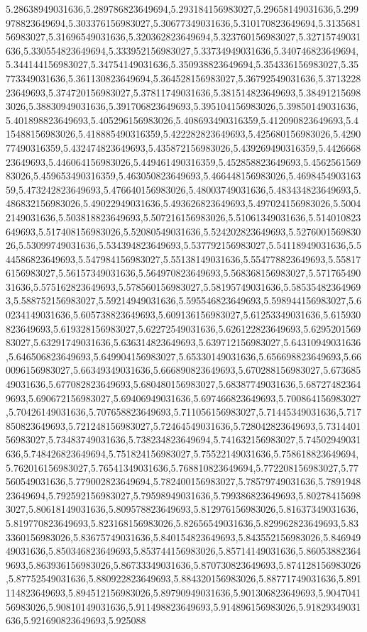 5.28638949031636,5.289786823649694,5.293184156983027,5.29658149031636,5.299978823649694,5.303376156983027,5.30677349031636,5.310170823649694,5.313568156983027,5.31696549031636,5.320362823649694,5.323760156983027,5.32715749031636,5.330554823649694,5.333952156983027,5.33734949031636,5.340746823649694,5.344144156983027,5.34754149031636,5.350938823649694,5.354336156983027,5.35773349031636,5.361130823649694,5.364528156983027,5.36792549031636,5.371322823649693,5.374720156983027,5.37811749031636,5.381514823649693,5.384912156983026,5.38830949031636,5.391706823649693,5.395104156983026,5.39850149031636,5.401898823649693,5.405296156983026,5.408693490316359,5.412090823649693,5.415488156983026,5.418885490316359,5.422282823649693,5.425680156983026,5.429077490316359,5.432474823649693,5.435872156983026,5.439269490316359,5.442666823649693,5.446064156983026,5.449461490316359,5.452858823649693,5.456256156983026,5.459653490316359,5.463050823649693,5.466448156983026,5.469845490316359,5.473242823649693,5.476640156983026,5.48003749031636,5.483434823649693,5.486832156983026,5.49022949031636,5.493626823649693,5.497024156983026,5.50042149031636,5.503818823649693,5.507216156983026,5.51061349031636,5.514010823649693,5.517408156983026,5.52080549031636,5.524202823649693,5.527600156983026,5.53099749031636,5.534394823649693,5.537792156983027,5.54118949031636,5.544586823649693,5.547984156983027,5.55138149031636,5.554778823649693,5.558176156983027,5.56157349031636,5.564970823649693,5.568368156983027,5.57176549031636,5.575162823649693,5.578560156983027,5.58195749031636,5.585354823649693,5.588752156983027,5.59214949031636,5.595546823649693,5.598944156983027,5.60234149031636,5.605738823649693,5.609136156983027,5.61253349031636,5.615930823649693,5.619328156983027,5.62272549031636,5.626122823649693,5.629520156983027,5.63291749031636,5.636314823649693,5.639712156983027,5.64310949031636,5.646506823649693,5.649904156983027,5.65330149031636,5.656698823649693,5.660096156983027,5.66349349031636,5.666890823649693,5.670288156983027,5.67368549031636,5.677082823649693,5.680480156983027,5.68387749031636,5.687274823649693,5.690672156983027,5.69406949031636,5.697466823649693,5.700864156983027,5.70426149031636,5.707658823649693,5.711056156983027,5.71445349031636,5.717850823649693,5.721248156983027,5.72464549031636,5.728042823649693,5.731440156983027,5.73483749031636,5.738234823649694,5.741632156983027,5.74502949031636,5.748426823649694,5.751824156983027,5.75522149031636,5.758618823649694,5.762016156983027,5.76541349031636,5.768810823649694,5.772208156983027,5.77560549031636,5.779002823649694,5.782400156983027,5.78579749031636,5.789194823649694,5.792592156983027,5.79598949031636,5.799386823649693,5.802784156983027,5.80618149031636,5.809578823649693,5.812976156983026,5.81637349031636,5.819770823649693,5.823168156983026,5.82656549031636,5.829962823649693,5.833360156983026,5.83675749031636,5.840154823649693,5.843552156983026,5.84694949031636,5.850346823649693,5.853744156983026,5.85714149031636,5.860538823649693,5.863936156983026,5.86733349031636,5.870730823649693,5.874128156983026,5.87752549031636,5.880922823649693,5.884320156983026,5.88771749031636,5.891114823649693,5.894512156983026,5.89790949031636,5.901306823649693,5.904704156983026,5.90810149031636,5.911498823649693,5.914896156983026,5.91829349031636,5.921690823649693,5.925088